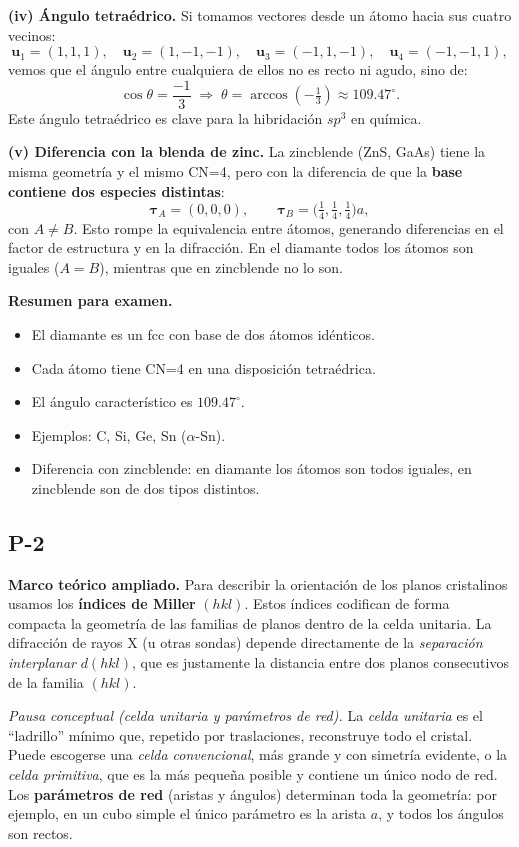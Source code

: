 \documentclass{article}
\begin{document}
\medskip
\textbf{(iv) Ángulo tetraédrico.}  
Si tomamos vectores desde un átomo hacia sus cuatro vecinos:
\[
\mathbf{u}_1=(1,1,1),\quad
\mathbf{u}_2=(1,-1,-1),\quad
\mathbf{u}_3=(-1,1,-1),\quad
\mathbf{u}_4=(-1,-1,1),
\]
vemos que el ángulo entre cualquiera de ellos no es recto ni agudo, sino de:
\[
\cos\theta=\frac{-1}{3}\;\Rightarrow\;\theta=\arccos(-\tfrac{1}{3})\approx 109.47^\circ.
\]
Este ángulo tetraédrico es clave para la hibridación \(sp^3\) en química.

\medskip
\textbf{(v) Diferencia con la blenda de zinc.}  
La zincblende (ZnS, GaAs) tiene la misma geometría y el mismo CN=4, pero con la diferencia de que la \textbf{base contiene dos especies distintas}:  
\[
\boldsymbol{\tau}_A=(0,0,0),\qquad 
\boldsymbol{\tau}_B=\big(\tfrac14,\tfrac14,\tfrac14\big)a,
\]
con \(A\neq B\). Esto rompe la equivalencia entre átomos, generando diferencias en el factor de estructura y en la difracción. En el diamante todos los átomos son iguales (\(A=B\)), mientras que en zincblende no lo son.

\medskip
\textbf{Resumen para examen.}
\begin{itemize}
\item El diamante es un fcc con base de dos átomos idénticos.  
\item Cada átomo tiene CN=4 en una disposición tetraédrica.  
\item El ángulo característico es \(109.47^\circ\).  
\item Ejemplos: C, Si, Ge, Sn (\(\alpha\)-Sn).  
\item Diferencia con zincblende: en diamante los átomos son todos iguales, en zincblende son de dos tipos distintos.  
\end{itemize}


\subsection{P-2}

\textbf{Marco teórico ampliado.}  
Para describir la orientación de los planos cristalinos usamos los \textbf{índices de Miller} \((hkl)\). Estos índices codifican de forma compacta la geometría de las familias de planos dentro de la celda unitaria. La difracción de rayos X (u otras sondas) depende directamente de la \emph{separación interplanar} \(d(hkl)\), que es justamente la distancia entre dos planos consecutivos de la familia \((hkl)\).

\medskip
\noindent\textit{Pausa conceptual (celda unitaria y parámetros de red).}  
La \emph{celda unitaria} es el “ladrillo” mínimo que, repetido por traslaciones, reconstruye todo el cristal. Puede escogerse una \emph{celda convencional}, más grande y con simetría evidente, o la \emph{celda primitiva}, que es la más pequeña posible y contiene un único nodo de red.  
Los \textbf{parámetros de red} (aristas y ángulos) determinan toda la geometría: por ejemplo, en un cubo simple el único parámetro es la arista \(a\), y todos los ángulos son rectos.
\end{document}
